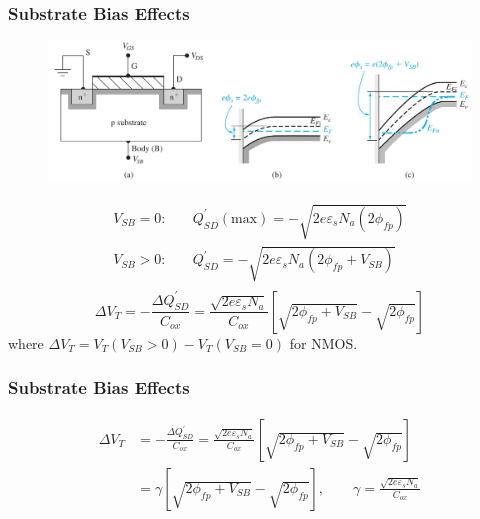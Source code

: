 \documentclass{beamer}
\begin{document}
    \begin{frame} \frametitle{Substrate Bias Effects}
        \begin{figure}[H]
            \centering
            \includegraphics[width=0.9\linewidth]{Substrate-bias-effects.jpg}
            \label{fig:Substrate-bias-effects.jpg}
        \end{figure}
        \begin{equation*}
            \begin{aligned}
                V_{SB} = 0 :\quad & Q^\prime_{SD} (\text{max}) = - \sqrt{2 e \varepsilon_s N_a (2 \phi_{fp} )} \\
                V_{SB} > 0 :\quad & Q^\prime_{SD} = - \sqrt{2 e \varepsilon_s N_a (2 \phi_{fp} + V_{SB} )} \\
            \end{aligned}
        \end{equation*}
        \begin{equation*}
            \boxed{\Delta V_T = - \frac{\Delta Q^\prime_{SD} }{C_{ox} } = \frac{\sqrt{2 e \varepsilon_s N_a}}{C_{ox} }  \left[ \sqrt{2\phi_{fp} + V_{SB}  } - \sqrt{2 \phi_{fp}}\right] }
        \end{equation*}
        where $\Delta V_T = V_T(V_{SB} > 0) - V_{T}(V_{SB} = 0) $ for NMOS.
    \end{frame}
    \begin{frame} \frametitle{Substrate Bias Effects}
        \begin{equation*}
            \boxed{
            \begin{aligned}
                \Delta V_T &= - \frac{\Delta Q^\prime_{SD} }{C_{ox} } = \frac{\sqrt{2 e \varepsilon_s N_a}}{C_{ox} }  \left[ \sqrt{2\phi_{fp} + V_{SB}  } - \sqrt{2 \phi_{fp}}\right] \\
                &= \gamma \left[ \sqrt{2\phi_{fp} + V_{SB}  } - \sqrt{2 \phi_{fp}}\right], \qquad \gamma = \frac{\sqrt{2 e \varepsilon_s N_a}}{C_{ox} }
            \end{aligned}
            }
        \end{equation*}
    \end{frame}
\end{document}
